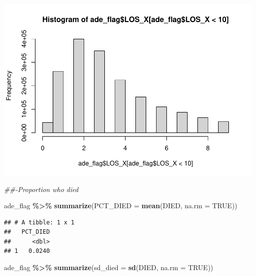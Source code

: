 \documentclass[preprint, 3p,
authoryear]{elsarticle} %
\newenvironment{Shaded}{\begin{snugshade}}{\end{snugshade}}
\newcommand{\CommentTok}[1]{\textcolor[rgb]{0.56,0.35,0.01}{\textit{#1}}}
\newcommand{\DataTypeTok}[1]{\textcolor[rgb]{0.13,0.29,0.53}{#1}}
\newcommand{\DecValTok}[1]{\textcolor[rgb]{0.00,0.00,0.81}{#1}}
\newcommand{\KeywordTok}[1]{\textcolor[rgb]{0.13,0.29,0.53}{\textbf{#1}}}
\newcommand{\NormalTok}[1]{#1}
\newcommand{\OperatorTok}[1]{\textcolor[rgb]{0.81,0.36,0.00}{\textbf{#1}}}
\newcommand{\OtherTok}[1]{\textcolor[rgb]{0.56,0.35,0.01}{#1}}
\newcommand{\StringTok}[1]{\textcolor[rgb]{0.31,0.60,0.02}{#1}}
\begin{document}
\begin{Shaded}
\end{Shaded}

\includegraphics{final-project-paper_files/figure-latex/los-4.pdf}

\begin{Shaded}
\begin{Highlighting}[]
\CommentTok{\#\#{-}Proportion who died }

\NormalTok{ade\_flag }\OperatorTok{\%\textgreater{}\%}
\StringTok{    }\KeywordTok{summarize}\NormalTok{(}\DataTypeTok{PCT\_DIED =} \KeywordTok{mean}\NormalTok{(DIED, }\DataTypeTok{na.rm =} \OtherTok{TRUE}\NormalTok{))}
\end{Highlighting}
\end{Shaded}

\begin{verbatim}
## # A tibble: 1 x 1
##   PCT_DIED
##      <dbl>
## 1   0.0240
\end{verbatim}

\begin{Shaded}
\begin{Highlighting}[]
\NormalTok{ade\_flag }\OperatorTok{\%\textgreater{}\%}
\StringTok{  }\KeywordTok{summarize}\NormalTok{(}\DataTypeTok{sd\_died =} \KeywordTok{sd}\NormalTok{(DIED, }\DataTypeTok{na.rm =} \OtherTok{TRUE}\NormalTok{))}
\end{Highlighting}
\end{Shaded}
\end{document}
